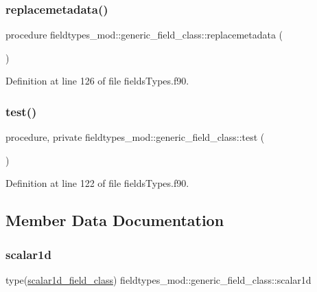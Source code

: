 \subsubsection{\texorpdfstring{replacemetadata()}{replacemetadata()}}
{\footnotesize\ttfamily procedure fieldtypes\+\_\+mod\+::generic\+\_\+field\+\_\+class\+::replacemetadata (\begin{DoxyParamCaption}{ }\end{DoxyParamCaption})\hspace{0.3cm}{\ttfamily [private]}}



Definition at line 126 of file fields\+Types.\+f90.

\mbox{\label{structfieldtypes__mod_1_1generic__field__class_a884e1d0b4152f873edc421ee4079aafb}} 
\subsubsection{\texorpdfstring{test()}{test()}}
{\footnotesize\ttfamily procedure, private fieldtypes\+\_\+mod\+::generic\+\_\+field\+\_\+class\+::test (\begin{DoxyParamCaption}{ }\end{DoxyParamCaption})\hspace{0.3cm}{\ttfamily [private]}}



Definition at line 122 of file fields\+Types.\+f90.



\subsection{Member Data Documentation}
\mbox{\label{structfieldtypes__mod_1_1generic__field__class_ab28f23e646f7cfe4a42d6dc47a896bf9}} 
\subsubsection{\texorpdfstring{scalar1d}{scalar1d}}
{\footnotesize\ttfamily type(\mbox{\hyperlink{structfieldtypes__mod_1_1scalar1d__field__class}{scalar1d\+\_\+field\+\_\+class}}) fieldtypes\+\_\+mod\+::generic\+\_\+field\+\_\+class\+::scalar1d\hspace{0.3cm}{\ttfamily [private]}}



